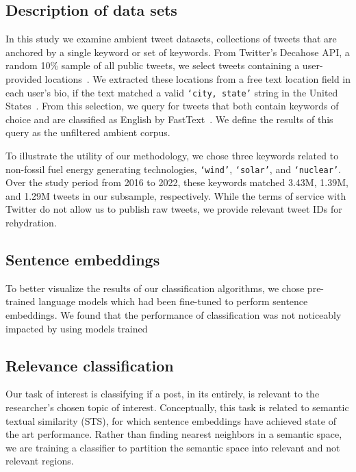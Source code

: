\subsection{Description of data sets}
\label{sec:corpusCreation.data}

In this study we examine ambient tweet datasets,
collections of tweets that are anchored by a single keyword or set of keywords. 
From Twitter's Decahose API,
a random 10\% sample of all public tweets,
we select tweets containing a user-provided locations~\cite{twitterDecahose}. 
We extracted these locations from a free text location field in each user's bio,
if the text matched a valid 
\texttt{`city, state'} string in the United States~\cite{gray2018english, linnell2021sleep}.
From this selection,
we query for tweets that both contain keywords of choice and are classified as English by FastText~\cite{joulin2017bag}.
We define the results of this query as the unfiltered ambient corpus.

To illustrate the utility of our methodology,
we chose three keywords related to non-fossil fuel energy generating technologies, \texttt{`wind'}, \texttt{`solar'}, and \texttt{`nuclear'}. 
Over the study period from 2016 to 2022,
these keywords matched 3.43M, 1.39M, and 1.29M tweets in our subsample, respectively.
While the terms of service with Twitter do not allow us to publish raw tweets,
we provide relevant tweet IDs for rehydration. 


\subsection{Sentence embeddings}
To better visualize the results of our classification algorithms, we chose pre-trained language models which had been fine-tuned to perform sentence embeddings. We found that the performance of classification was not noticeably impacted by using models trained 


\subsection{Relevance classification}
Our task of interest is classifying if a post, 
in its entirely,
is relevant to the researcher's chosen topic of interest. 
Conceptually, this task is related to semantic textual similarity (STS), 
for which sentence embeddings have achieved state of the art performance. 
Rather than finding nearest neighbors in a semantic space,
we are training a classifier to partition the semantic space into relevant and not relevant regions.

